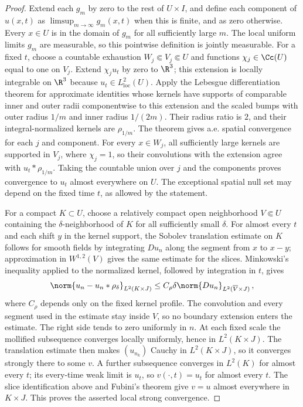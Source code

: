 \documentclass[11pt,reqno]{amsart}
\begin{document}
\begin{proof}
Extend each $g_m$ by zero to the rest of $U\times I$, and define each component of $u(x,t)$ as $\limsup_{m\to\infty}g_m(x,t)$ when this is finite, and as zero otherwise. Every $x\in U$ is in the domain of $g_m$ for all sufficiently large $m$. The local uniform limits $g_m$ are measurable, so this pointwise definition is jointly measurable. For a fixed $t$, choose a countable exhaustion $W_j\Subset V_j\Subset U$
and functions $\chi_j\in\Cc(U)$ equal to one on $V_j$. Extend
$\chi_j u_t$ by zero to $\R^3$; this extension is locally integrable on
$\R^3$ because $u_t\in L^2_{\mathrm{loc}}(U)$. Apply the Lebesgue differentiation theorem for approximate identities
whose kernels have supports of comparable inner and outer radii
componentwise to this extension and the scaled bumps with outer radius $1/m$
and inner radius $1/(2m)$. Their radius ratio is $2$, and their
integral-normalized kernels are $\rho_{1/m}$. The theorem gives a.e. spatial
convergence for each $j$ and component. For every $x\in W_j$, all
sufficiently large kernels are supported in $V_j$, where $\chi_j=1$, so
their convolutions with the extension agree with $u_t*\rho_{1/m}$. Taking
the countable union over $j$ and the components proves convergence to $u_t$
almost everywhere on $U$. The exceptional spatial null set may depend on
the fixed time $t$, as allowed by the statement.

For a compact $K\subset U$, choose a relatively compact open neighborhood $V\Subset U$ containing the $\delta$-neighborhood of $K$ for all sufficiently small $\delta$. For almost every $t$ and each shift $y$ in the kernel support, the Sobolev translation estimate on $K$ follows for smooth fields by integrating $Du_n$ along the segment from $x$ to $x-y$; approximation in $W^{1,2}(V)$ gives the same estimate for the slices. Minkowski's inequality applied to the normalized kernel, followed by integration in $t$, gives
\begin{equation*}
\norm{u_n-u_n*\rho_\delta}_{L^2(K\times J)}\le C_\rho\delta\norm{Du_n}_{L^2(\overline V\times J)}\,,
\end{equation*}
where $C_\rho$ depends only on the fixed kernel profile. The convolution and every segment used in the estimate stay inside $V$, so no boundary extension enters the estimate. The right side tends to zero uniformly in $n$. At each fixed scale the mollified subsequence converges locally uniformly, hence in $L^2(K\times J)$. The translation estimate then makes $(u_{n_k})$ Cauchy in $L^2(K\times J)$, so it converges strongly there to some $v$. A further subsequence converges in $L^2(K)$ for almost every $t$; its every-time weak limit is $u_t$, so $v(\cdot,t)=u_t$ for almost every $t$. The slice identification above and Fubini's theorem give $v=u$ almost everywhere in $K\times J$. This proves the asserted local strong convergence.


\end{proof}
\end{document}
